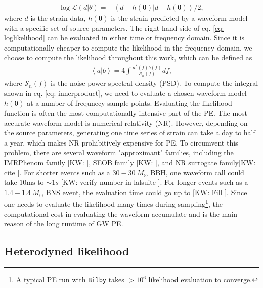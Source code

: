 \documentclass[twocolumn]{aastex631}
\newcommand{\kw}[1]{{\color{rb4}[KW: #1 ]}}
\begin{document}
\begin{align}
    \log{\mathcal{L}(d|\theta)} = -\left<d-h(\mathbf{\theta})|d-h(\mathbf{\theta})\right>/2,
\label{eq: loglikelihood}
\end{align}
where $d$ is the strain data, $h(\mathbf{\theta})$ is the strain predicted by a
waveform model with a specific set of source parameters. The right hand side of
eq. \ref{eq: loglikelihood} can be evaluated in either time or frequency domain.
Since it is computationally cheaper to compute the likelihood in the frequency
domain, we choose to compute the likelihood throughout this work, which can be defined as 
\begin{align}
    \left<a|b\right> = 4 \int \frac{a^*(f)b(f)}{\mathcal{S}_n(f)} df,
\label{eq: innerproduct}
\end{align}
where $\mathcal{S}_n(f)$ is the noise power spectral density (PSD). To compute
the integral shown in eq. \ref{eq: innerproduct}, we need to evaluate a chosen
waveform model $h(\mathbf{\theta})$ at a number of frequnecy sample points.
Evaluating the likelihood function is often the most computationally intensive
part of the PE. The most accurate waveform model is numerical relativity (NR).
However, depending on the source parameters, generating one time series of
strain can take a day to half a year, which makes NR prohibitively
expensive for PE. To circumvent this problem, there are several waveform
"approximant" families, including the IMRPhenom family \kw{}, SEOB family \kw{},
and NR surrogate family\kw{cite}. For shorter events such as a $30-30\ M_{\odot}$
BBH, one waveform call could take $10\text{ms}$ to $\sim 1s$ \kw{verify number
in lalsuite}. For longer events such as a $1.4-1.4\ M_{\odot}$ BNS event, the
evaluation time could go up to \kw{Fill}. Since one needs to evaluate the
likelihood many times during sampling\footnote{A typical PE run with
\texttt{Bilby} takes $>10^6$ likelihood evaluation to converge.}, the
computational cost in evaluating the waveform accumulate and is the main reason
of the long runtime of GW PE.

\subsection{Heterodyned likelihood}
\end{document}
